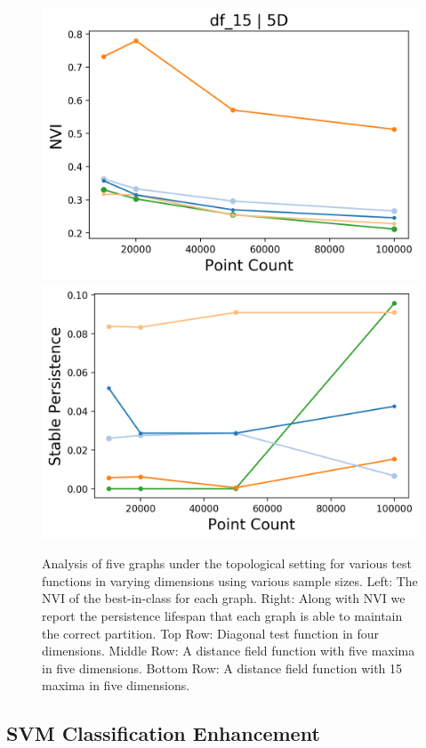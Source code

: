 \begin{figure}[htbp]
    \includegraphics[width=0.48\linewidth]{figs/chap7/df_15_5D_nvi.png}
    \includegraphics[width=0.48\linewidth]{figs/chap7/df_15_5D.png}
    \caption[Analysis of graphs for topological stability]{Analysis of five graphs under the topological setting for various test functions in varying dimensions using various sample sizes.
    Left: The NVI of the best-in-class for each graph.
    Right: Along with NVI we report the persistence lifespan that each graph is able to maintain the correct partition.
    Top Row: Diagonal test function in four dimensions.
    Middle Row: A distance field function with five maxima in five dimensions.
    Bottom Row: A distance field function with 15 maxima in five dimensions.}
    \label{fig:graph_topo}
\end{figure}

\subsection{SVM Classification Enhancement}

